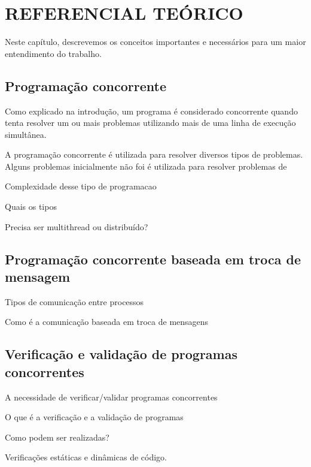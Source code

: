 
\chapter{REFERENCIAL TEÓRICO}
\label{cap:referencial_teorico}

Neste capítulo, descrevemos os conceitos importantes e necessários para um maior entendimento do trabalho.

\section{Programação concorrente}

Como explicado na introdução, um programa é considerado concorrente quando tenta resolver um ou mais problemas utilizando mais de uma linha de execução simultânea. 

A programação concorrente é utilizada para resolver diversos tipos de problemas. Alguns problemas inicialmente não foi é utilizada para resolver problemas de 

Complexidade desse tipo de programacao

Quais os tipos

Precisa ser multithread ou distribuído?


\section{Programação concorrente baseada em troca de mensagem}

Tipos de comunicação entre processos

Como é a comunicação baseada em troca de mensagens

\section{Verificação e validação de programas concorrentes}

A necessidade de verificar/validar programas concorrentes

 O que é a verificação e a validação de programas

 Como podem ser realizadas?

 Verificações estáticas e dinâmicas de código.
 